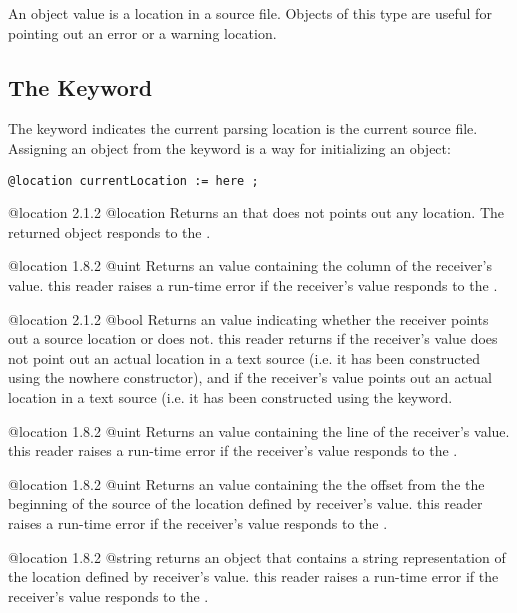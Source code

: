 
An  object value is a location in a source file. Objects of this type are useful for pointing out an error or a warning location.

\subsection{The  Keyword}

The  keyword indicates the current parsing location is the current source file. Assigning an  object from the  keyword is a way for initializing an  object:\newline

\texttt{@location currentLocation := here ;}

{@location}
{2.1.2}
{@location}
{Returns an  that does not points out any location.}
{The returned object responds  to the .}


{@location}
{1.8.2}
{@uint}
{Returns an  value containing the column of the receiver's value.}
{this reader raises a run-time error if the receiver's value responds  to the .}


{@location}
{2.1.2}
{@bool}
{Returns an  value indicating whether the receiver points out a source location or does not.}
{this reader returns  if the receiver's value does not point out an actual location in a text source (i.e. it has been constructed using the nowhere constructor), and  if the receiver's value points out an actual location in a text source (i.e. it has been constructed using the  keyword.}


{@location}
{1.8.2}
{@uint}
{Returns an  value containing the line of the receiver's value.}
{this reader raises a run-time error if the receiver's value responds  to the .}


{@location}
{1.8.2}
{@uint}
{Returns an  value containing the the offset from the the beginning of the source of the location defined by receiver's value.}
{this reader raises a run-time error if the receiver's value responds  to the .}


{@location}
{1.8.2}
{@string}
{returns an  object that contains a string representation of the location defined by receiver's value.}
{this reader raises a run-time error if the receiver's value responds  to the .}

